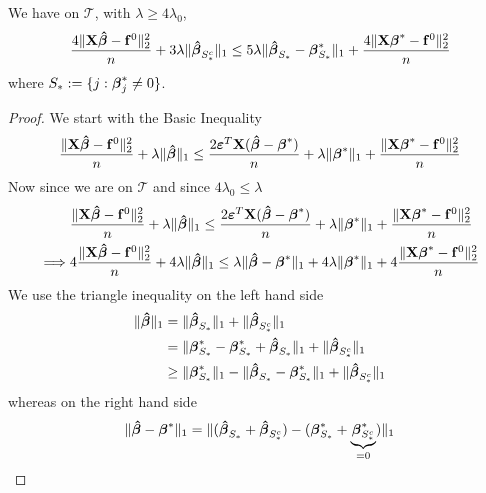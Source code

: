 \begin{lemma}
    We have on $\mathscr{T}$, with $\lambda \geq 4 \lambda_{0}$,
    \begin{equation}
        \label{eqn: new version of lemma 6.3.}
        \frac{4 \|\mathbf{X} \boldsymbol{\hat{\beta}}-\mathbf{f}^0\|_{2}^{2}}{n} + 3 \lambda \| \boldsymbol{\hat{\beta}}_{S^{c}_{*}} \|_{1} \leq 5 \lambda \| \boldsymbol{\hat{\beta}}_{S_{*}} - \boldsymbol{\beta}_{S_{*}}^{*} \|_{1} + \frac{4 \|\mathbf{X} \boldsymbol{\beta}^{*} - \mathbf{f}^{0} \|_{2}^{2}}{n}
    \end{equation}
    where $S_* := \{ j: \boldsymbol{\beta}_j^* \neq 0 \}$.
\end{lemma}
\begin{proof}
    We start with the Basic Inequality
    $$
        \frac{\|\mathbf{X} \boldsymbol{\hat{\beta}} - \mathbf{f}^0 \|_{2}^{2}}{n} + \lambda\| \boldsymbol{\hat{\beta}} \|_{1} \leq  \frac{2 \boldsymbol{\varepsilon}^T \mathbf{X} (\boldsymbol{\hat{\beta}} - \boldsymbol{\beta}^*)}{n} + \lambda \| \boldsymbol{\beta}^*\|_{1} + \frac{\|\mathbf{X} \boldsymbol{\beta}^* - \mathbf{f}^0\|_{2}^{2}}{n}
    $$
    Now since we are on $\mathscr{T}$ and since $4 \lambda_0 \leq \lambda$
    \begin{align*}
                 & \frac{\|\mathbf{X} \boldsymbol{\hat{\beta}} - \mathbf{f}^0 \|_{2}^{2}}{n} + \lambda\| \boldsymbol{\hat{\beta}} \|_{1} \leq  \frac{2 \boldsymbol{\varepsilon}^T \mathbf{X} (\boldsymbol{\hat{\beta}} - \boldsymbol{\beta}^*)}{n} + \lambda \| \boldsymbol{\beta}^*\|_{1} + \frac{\|\mathbf{X} \boldsymbol{\beta}^* - \mathbf{f}^0\|_{2}^{2}}{n} \\
        \implies &
        4 \frac{\| \mathbf{X} \boldsymbol{\hat{\beta}} - \mathbf{f}^0 \|_{2}^{2}}{n} + 4 \lambda\| \boldsymbol{\hat{\beta}} \|_{1} \leq \lambda \| \boldsymbol{\hat{\beta}} - \boldsymbol{\beta}^* \|_{1} + 4 \lambda \| \boldsymbol{\beta}^*\|_{1} + 4\frac{\|\mathbf{X} \boldsymbol{\beta}^* - \mathbf{f}^0\|_{2}^{2}}{n}           \\
    \end{align*}
    We use the triangle inequality on the left hand side
    \begin{align*}
        \|\boldsymbol{\hat{\beta}}\|_{1}
         & = \|\boldsymbol{\hat{\beta}}_{S_{*}} \|_{1} + \|\boldsymbol{\hat{\beta}}_{S_{*}^{c}} \|_{1}                                                \\
         & = \|\boldsymbol{\beta}_{S_{*}}^{*} - \boldsymbol{\beta}_{S_{*}}^{*} + \boldsymbol{\hat{\beta}}_{S_{*}} \|_{1} + \|\boldsymbol{\hat{\beta}}_{S_{*}^{c}} \|_{1}          \\
         & \geq \|\boldsymbol{\beta}_{S_{*}}^{*} \|_{1} - \|\boldsymbol{\hat{\beta}}_{S_{*}}-\boldsymbol{\beta}_{S_{*}}^{*} \|_{1}+ \|\boldsymbol{\hat{\beta}}_{S_{*}^{c}} \|_{1}
    \end{align*}
    whereas on the right hand side
    \begin{align*}
        \|\btahat-\bta^{*} \|_{1}
         & =  \| (\btahat_{S_{*}} + \btahat_{S_{*}^{c}}) - (\bta_{S_{*}}^{*} + \underbrace{\bta_{S_{*}^{c}}^*}_{=0}) \|_{1} \\

\end{align*}
\end{proof}
